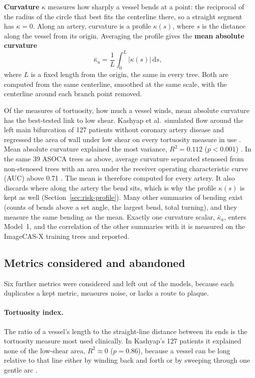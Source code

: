 \textbf{Curvature} $\kappa$ measures how sharply a vessel bends at a point: the reciprocal of the radius of the circle that best fits the centerline there, so a straight segment has $\kappa = 0$.
Along an artery, curvature is a profile $\kappa(s)$, where $s$ is the distance along the vessel from its origin.
Averaging the profile gives the \textbf{mean absolute curvature}
\begin{equation}
  \bar\kappa_a = \frac{1}{L}\int_0^L \lvert \kappa(s) \rvert \, \mathrm{d}s,
  \label{eq:risk-kappa}
\end{equation}
where $L$ is a fixed length from the origin, the same in every tree.
Both are computed from the same centerline, smoothed at the same scale, with the centerline around each branch point removed.

Of the measures of tortuosity, how much a vessel winds, mean absolute curvature has the best-tested link to low shear.
Kashyap et al.\ simulated flow around the left main bifurcation of 127 patients without coronary artery disease and regressed the area of wall under low shear on every tortuosity measure in use \cite{kashyap2022tortuosity}.
Mean absolute curvature explained the most variance, $R^2 = 0.112$ ($p < 0.001$) \cite{kashyap2022tortuosity}.
In the same 39 ASOCA trees as above, average curvature separated stenosed from non-stenosed trees with an area under the receiver operating characteristic curve (AUC) above 0.71 \cite{zhang2024curvature}.
The mean is therefore computed for every artery.
It also discards where along the artery the bend sits, which is why the profile $\kappa(s)$ is kept as well (Section~\ref{sec:risk-profile}).
Many other summaries of bending exist (counts of bends above a set angle, the largest bend, total turning), and they measure the same bending as the mean.
Exactly one curvature scalar, $\bar\kappa_a$, enters Model~1, and the correlation of the other summaries with it is measured on the ImageCAS-X training trees and reported.

\subsection{Metrics considered and abandoned}

Six further metrics were considered and left out of the models, because each duplicates a kept metric, measures noise, or lacks a route to plaque.

\paragraph{Tortuosity index.}
The ratio of a vessel's length to the straight-line distance between its ends is the tortuosity measure most used clinically.
In Kashyap's 127 patients it explained none of the low-shear area, $R^2 \approx 0$ ($p = 0.86$), because a vessel can be long relative to that line either by winding back and forth or by sweeping through one gentle arc \cite{kashyap2022tortuosity}.

